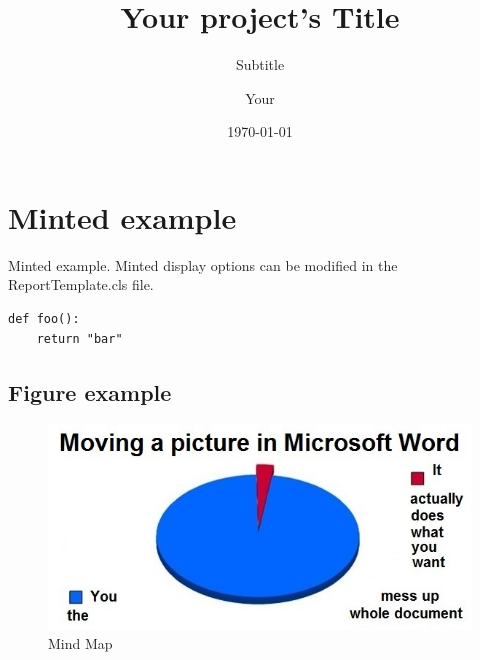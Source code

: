 \documentclass{ReportTemplate}
\title{Your project's Title}
\author{Your}
\date{\today}
\subtitle{Subtitle}
\begin{document}
\maketitlepage{}

\newpage

\maketableofcontent{}

\newpage

\section{Minted example}
Minted example. Minted display options can be modified in the ReportTemplate.cls file.
\begin{verbatim}
def foo():
    return "bar"
\end{verbatim}
\subsection{Figure example}
\begin{figure}[H]
    \centering
    \includegraphics[width=\textwidth]{imageSources/meme.jpg}
    \caption{Mind Map}
    \label{fig:MindMap}
\end{figure}
\end{document}
